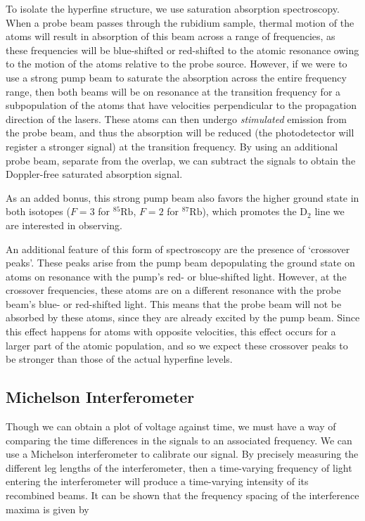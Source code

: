 \documentclass[12pt]{article}
\begin{document}
To isolate the hyperfine structure, we use saturation absorption spectroscopy.  When a probe beam passes through the rubidium sample, thermal motion of the atoms will result in absorption of this beam across a range of frequencies, as these frequencies will be blue-shifted or red-shifted to the atomic resonance owing to the motion of the atoms relative to the probe source.  However, if we were to use a strong pump beam to saturate the absorption across the entire frequency range, then both beams will be on resonance at the transition frequency for a subpopulation of the atoms that have velocities perpendicular to the propagation direction of the lasers.  These atoms can then undergo \textit{stimulated} emission from the probe beam, and thus the absorption will be reduced (the photodetector will register a stronger signal) at the transition frequency.  By using an additional probe beam, separate from the overlap, we can subtract the signals to obtain the Doppler-free saturated absorption signal.

As an added bonus, this strong pump beam also favors the higher ground state in both isotopes ($F=3$ for ${}^{85}\text{Rb}$, $F = 2$ for ${}^{87}\text{Rb}$), which promotes the D$_2$ line we are interested in observing.

An additional feature of this form of spectroscopy are the presence of `crossover peaks'.  These peaks arise from the pump beam depopulating the ground state on atoms on resonance with the pump's red- or blue-shifted light.  However, at the crossover frequencies, these atoms are on a different resonance with the probe beam's blue- or red-shifted light.  This means that the probe beam will not be absorbed by these atoms, since they are already excited by the pump beam.  Since this effect happens for atoms with opposite velocities, this effect occurs for a larger part of the atomic population, and so we expect these crossover peaks to be stronger than those of the actual hyperfine levels.

\subsection*{Michelson Interferometer}

Though we can obtain a plot of voltage against time, we must have a way of comparing the time differences in the signals to an associated frequency.  We can use a Michelson interferometer to calibrate our signal.  By precisely measuring the different leg lengths of the interferometer, then a time-varying frequency of light entering the interferometer will produce a time-varying intensity of its recombined beams.  It can be shown that the frequency spacing of the interference maxima is given by
\end{document}
